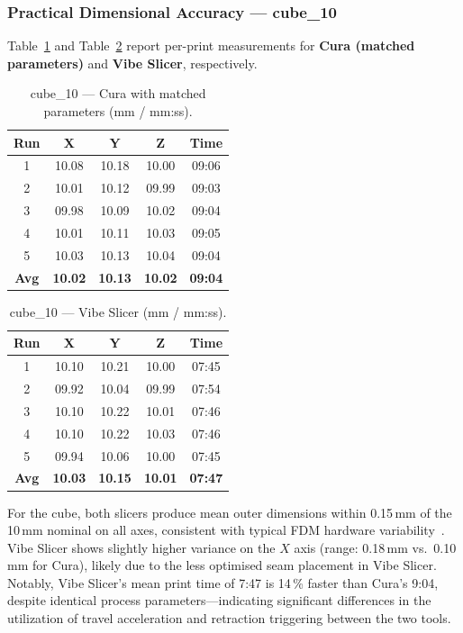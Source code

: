 \documentclass[10pt,twocolumn,a4paper]{article}
\begin{document}
\subsubsection*{Practical Dimensional Accuracy — cube\_10}

Table~\ref{tab:cube_cura_vs} and Table~\ref{tab:cube_vibe}
report per-print measurements for \textbf{Cura (matched parameters)}
and \textbf{Vibe Slicer}, respectively.

\begin{table}[H]
\centering
\caption{cube\_10 — Cura with matched parameters (mm / mm:ss).}
\label{tab:cube_cura_vs}
\small
\begin{tabular}{@{}ccccc@{}}
\toprule
\textbf{Run} & \textbf{X} & \textbf{Y} & \textbf{Z} & \textbf{Time} \\
\midrule
1 & 10.08 & 10.18 & 10.00 & 09:06 \\
2 & 10.01 & 10.12 & 09.99 & 09:03 \\
3 & 09.98 & 10.09 & 10.02 & 09:04 \\
4 & 10.01 & 10.11 & 10.03 & 09:05 \\
5 & 10.03 & 10.13 & 10.04 & 09:04 \\
\midrule
\textbf{Avg} & \textbf{10.02} & \textbf{10.13} & \textbf{10.02} & \textbf{09:04} \\
\bottomrule
\end{tabular}
\end{table}

\begin{table}[H]
\centering
\caption{cube\_10 — Vibe Slicer (mm / mm:ss).}
\label{tab:cube_vibe}
\small
\begin{tabular}{@{}ccccc@{}}
\toprule
\textbf{Run} & \textbf{X} & \textbf{Y} & \textbf{Z} & \textbf{Time} \\
\midrule
1 & 10.10 & 10.21 & 10.00 & 07:45 \\
2 & 09.92 & 10.04 & 09.99 & 07:54 \\
3 & 10.10 & 10.22 & 10.01 & 07:46 \\
4 & 10.10 & 10.22 & 10.03 & 07:46 \\
5 & 09.94 & 10.06 & 10.00 & 07:45 \\
\midrule
\textbf{Avg} & \textbf{10.03} & \textbf{10.15} & \textbf{10.01} & \textbf{07:47} \\
\bottomrule
\end{tabular}
\end{table}

For the cube, both slicers produce mean outer dimensions within
0.15\,mm of the 10\,mm nominal on all axes, consistent with
typical FDM hardware variability~\cite{gibson2021additive}.
Vibe Slicer shows slightly higher variance on the $X$ axis
(range: 0.18\,mm vs.\ 0.10\,mm for Cura), likely due to the
less optimised seam placement in Vibe Slicer.
Notably, Vibe Slicer's mean print time of 7:47 is 14\,\% faster
than Cura's 9:04, despite identical process parameters—indicating
significant differences in the utilization of travel acceleration and retraction triggering
between the two tools.
\end{document}
